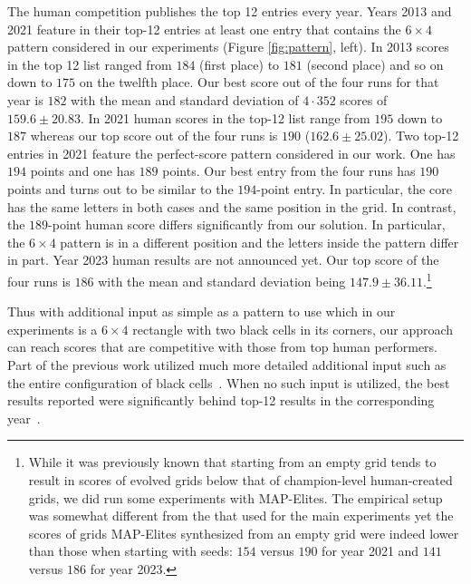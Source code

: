 The human competition publishes the top 12 entries every year. Years 2013 and 2021 feature in their top-12 entries at least one entry that contains the $6 \times 4$ pattern considered in our experiments (Figure \ref{fig:pattern}, left). In 2013 scores in the top 12 list ranged from $184$ (first place) to $181$ (second place) and so on down to $175$ on the twelfth place. Our best score out of the four runs for that year is $182$  with the mean and standard deviation of $4 \cdot 352$ scores of $159.6  \pm 20.83$. In 2021 human scores in the top-12 list range from $195$ down to $187$ whereas our top score out of the four runs is $190$ ($162.6 \pm 25.02$). Two top-12 entries in 2021 feature the perfect-score pattern considered in our work. One has $194$ points and one has $189$ points. Our best entry from the four runs has $190$ points and turns out to be similar to the $194$-point entry. In particular, the core has the same letters in both cases and the same position in the grid. In contrast, the $189$-point human score differs significantly from our solution. In particular, the $6 \times 4$ pattern is in a different position and the letters inside the pattern differ in part. Year 2023 human results are not announced yet. Our top score of the four runs is $186$ with the mean and standard deviation being $147.9 \pm 36.11$.\footnote{While it was previously known that starting from an empty grid tends to result in scores of evolved grids below that of champion-level human-created grids, we did run some experiments with MAP-Elites. The empirical setup was somewhat different from the that used for the main experiments yet the scores of grids MAP-Elites synthesized from an empty grid were indeed lower than those when starting with seeds: $154$ versus $190$ for year 2021 and $141$ versus $186$ for year 2023.}

Thus with additional input as simple as a pattern to use which in our experiments is a $6 \times 4$ rectangle with two black cells in its corners, our approach can reach scores that are competitive with those from top human performers. Part of the previous work utilized much more detailed additional input such as the entire configuration of black cells~\cite{DBLP:conf/socs/BoteaB21}. When no such input is utilized, the best results reported were significantly behind top-12 results in the corresponding
year~\cite{DBLP:conf/cig/BulitkoB21,Botea_Bulitko_2022}.




